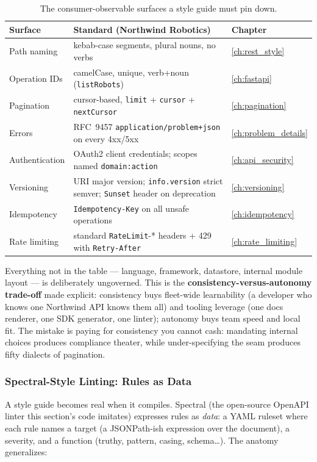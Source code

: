 \begin{table}[htbp]
\centering\small
\begin{tabularx}{\textwidth}{l X l}
\toprule
\textbf{Surface} & \textbf{Standard (Northwind Robotics)} & \textbf{Chapter} \\
\midrule
Path naming & kebab-case segments, plural nouns, no verbs & \ref{ch:rest_style} \\
Operation IDs & camelCase, unique, verb+noun (\texttt{listRobots}) & \ref{ch:fastapi} \\
Pagination & cursor-based, \texttt{limit} + \texttt{cursor} + \texttt{nextCursor} & \ref{ch:pagination} \\
Errors & RFC~9457 \texttt{application/problem+json} on every 4xx/5xx & \ref{ch:problem_details} \\
Authentication & OAuth2 client credentials; scopes named \texttt{domain:action} & \ref{ch:api_security} \\
Versioning & URI major version; \texttt{info.version} strict semver; \texttt{Sunset} header on deprecation & \ref{ch:versioning} \\
Idempotency & \texttt{Idempotency-Key} on all unsafe operations & \ref{ch:idempotency} \\
Rate limiting & standard \texttt{RateLimit}-* headers + 429 with \texttt{Retry-After} & \ref{ch:rate_limiting} \\
\bottomrule
\end{tabularx}
\caption{The consumer-observable surfaces a style guide must pin down.}
\label{tab:ch20-styleguide}
\end{table}

Everything not in the table --- language, framework, datastore, internal
module layout --- is deliberately ungoverned. This is the
\textbf{consistency-versus-autonomy trade-off} made explicit: consistency
buys fleet-wide learnability (a developer who knows one Northwind API
knows them all) and tooling leverage (one docs renderer, one SDK
generator, one linter); autonomy buys team speed and local fit. The
mistake is paying for consistency you cannot cash: mandating internal
choices produces compliance theater, while under-specifying the seam
produces fifty dialects of pagination.

\subsubsection{Spectral-Style Linting: Rules as Data}
A style guide becomes real when it compiles. Spectral (the open-source
OpenAPI linter this section's code imitates) expresses rules as
\emph{data}: a YAML ruleset where each rule names a target (a JSONPath-ish
expression over the document), a severity, and a function (truthy, pattern,
casing, schema\ldots). The anatomy generalizes:

